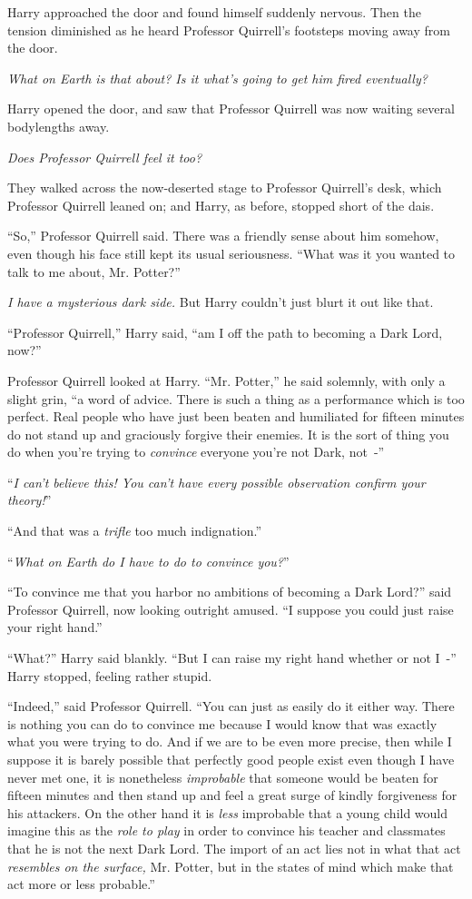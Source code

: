 Harry approached the door and found himself suddenly nervous. Then the tension diminished as he heard Professor Quirrell's footsteps moving away from the door.

\emph{What on Earth is that about? Is it what's going to get him fired eventually?}

Harry opened the door, and saw that Professor Quirrell was now waiting several bodylengths away.

\emph{Does Professor Quirrell feel it too?}

They walked across the now-deserted stage to Professor Quirrell's desk, which Professor Quirrell leaned on; and Harry, as before, stopped short of the dais.

``So,'' Professor Quirrell said. There was a friendly sense about him somehow, even though his face still kept its usual seriousness. ``What was it you wanted to talk to me about, Mr. Potter?''

\emph{I have a mysterious dark side.} But Harry couldn't just blurt it out like that.

``Professor Quirrell,'' Harry said, ``am I off the path to becoming a Dark Lord, now?''

Professor Quirrell looked at Harry. ``Mr. Potter,'' he said solemnly, with only a slight grin, ``a word of advice. There is such a thing as a performance which is too perfect. Real people who have just been beaten and humiliated for fifteen minutes do not stand up and graciously forgive their enemies. It is the sort of thing you do when you're trying to \emph{convince} everyone you're not Dark, not~-''

``\emph{I can't believe this! You can't have every possible observation confirm your theory!}''

``And that was a \emph{trifle} too much indignation.''

``\emph{What on Earth do I have to do to convince you?}''

``To convince me that you harbor no ambitions of becoming a Dark Lord?'' said Professor Quirrell, now looking outright amused. ``I suppose you could just raise your right hand.''

``What?'' Harry said blankly. ``But I can raise my right hand whether or not I~-'' Harry stopped, feeling rather stupid.

``Indeed,'' said Professor Quirrell. ``You can just as easily do it either way. There is nothing you can do to convince me because I would know that was exactly what you were trying to do. And if we are to be even more precise, then while I suppose it is barely possible that perfectly good people exist even though I have never met one, it is nonetheless \emph{improbable} that someone would be beaten for fifteen minutes and then stand up and feel a great surge of kindly forgiveness for his attackers. On the other hand it is \emph{less} improbable that a young child would imagine this as the \emph{role to play} in order to convince his teacher and classmates that he is not the next Dark Lord. The import of an act lies not in what that act \emph{resembles on the surface,} Mr. Potter, but in the states of mind which make that act more or less probable.''

